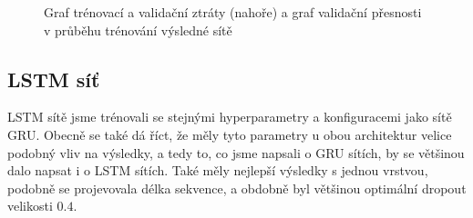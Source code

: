 \begin{figure}[] %
    \centering
    \caption{Graf trénovací a validační ztráty (nahoře) a graf validační přesnosti v průběhu trénování výsledné sítě}
    \label{graph:gru}
\end{figure}

\subsection{LSTM síť}

LSTM sítě jsme trénovali se stejnými hyperparametry a konfiguracemi jako sítě
GRU. Obecně se také dá říct, že měly tyto parametry u obou architektur velice
podobný vliv na výsledky, a tedy to, co jsme napsali o GRU sítích, by se
většinou dalo napsat i o LSTM sítích. Také měly nejlepší výsledky s jednou
vrstvou, podobně se projevovala délka sekvence, a obdobně byl většinou
optimální dropout velikosti $0.4$.

